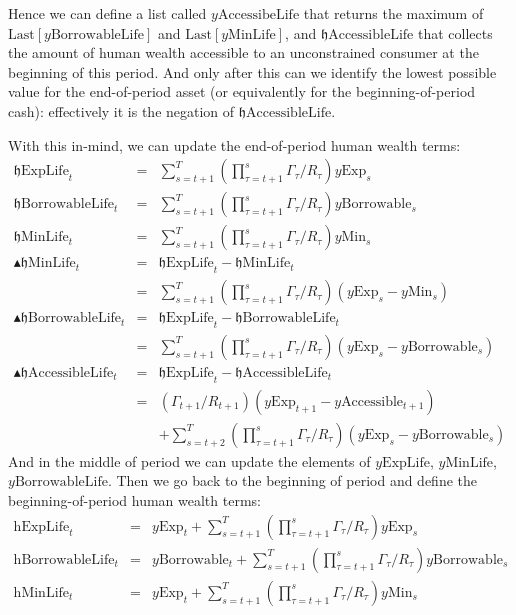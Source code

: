 \documentclass[titlepage,abstract]{\econtex}
\providecommand{\hExpLife}{\mathrm{h}\text{ExpLife}}
\providecommand{\hMinLife}{\mathrm{h}\text{MinLife}}
\providecommand{\hBorrowableLife}{\mathrm{h}\text{BorrowableLife}}
\providecommand{\hEndExpLife}{\mathfrak{h}\text{ExpLife}}
\providecommand{\hEndMinLife}{\mathfrak{h}\text{MinLife}}
\providecommand{\hEndBorrowableLife}{\mathfrak{h}\text{BorrowableLife}}
\providecommand{\hEndAccessibleLife}{\mathfrak{h}\text{AccessibleLife}}
\providecommand{\DeltahEndMinLife}{\blacktriangle \mathfrak{h}\text{MinLife}}
\providecommand{\DeltahEndBorrowableLife}{\blacktriangle \mathfrak{h}\text{BorrowableLife}}
\providecommand{\DeltahEndAccessibleLife}{\blacktriangle \mathfrak{h}\text{AccessibleLife}}
\providecommand{\yMinLife}{y\text{MinLife}}
\providecommand{\yBorrowableLife}{y\text{BorrowableLife}}
\providecommand{\yAccessibleLife}{y\text{AccessibeLife}}
\providecommand{\yExpLife}{y\text{ExpLife}}
\providecommand{\yMin}{y\text{Min}}
\providecommand{\yBorrowable}{y\text{Borrowable}}
\providecommand{\yAccessible}{y\text{Accessible}}
\providecommand{\yExp}{y\text{Exp}}
\begin{document}
Hence we can define a list called $\yAccessibleLife$ that returns the maximum of $\text{Last}[\yBorrowableLife]$ and $\text{Last}[\yMinLife]$, and $\hEndAccessibleLife$ that collects the amount of human wealth accessible to an unconstrained consumer at the beginning of this period. And only after this can we identify the lowest possible value for the end-of-period asset (or equivalently for the beginning-of-period cash): effectively it is the negation of $\hEndAccessibleLife$.

With this in-mind, we can update the end-of-period human wealth terms:
\begin{eqnarray}
          \hEndExpLife_{t} &=& \sum_{s=t+1}^{T} (\prod_{\tau=t+1}^{s}\Gamma_{\tau} /R_{\tau}) \yExp_{s} \\
          \hEndBorrowableLife_{t} &=& \sum_{s=t+1}^{T} (\prod_{\tau=t+1}^{s}\Gamma_{\tau}/R_{\tau}) \yBorrowable_{s} \\
          \hEndMinLife_{t} &=& \sum_{s=t+1}^{T} (\prod_{\tau=t+1}^{s}\Gamma_{\tau}/R_{\tau}) \yMin_{s} \\
          \DeltahEndMinLife_{t} &=& \hEndExpLife_{t} -  \hEndMinLife_{t}\\
                          &=& \sum_{s=t+1}^{T} (\prod_{\tau=t+1}^{s}\Gamma_{\tau}/R_{\tau}) (\yExp_{s}-\yMin_{s}) \\
          \DeltahEndBorrowableLife_{t} &=& \hEndExpLife_{t} -  \hEndBorrowableLife_{t}\\
                          &=& \sum_{s=t+1}^{T} (\prod_{\tau=t+1}^{s}\Gamma_{\tau}/R_{\tau}) (\yExp_{s}-\yBorrowable_{s}) \\
          \DeltahEndAccessibleLife_{t} &=& \hEndExpLife_{t} -  \hEndAccessibleLife_{t}\\
                          &=& (\Gamma_{t+1}/R_{t+1}) (\yExp_{t+1}-\yAccessible_{t+1}) \\
                          & & +\sum_{s=t+2}^{T} (\prod_{\tau=t+1}^{s}\Gamma_{\tau}/R_{\tau}) (\yExp_{s}-\yBorrowable_{s})
\end{eqnarray}
And in the middle of period we can update the elements of $\yExpLife$, $\yMinLife$, $\yBorrowableLife$. Then we go back to the beginning of period and define the beginning-of-period human wealth terms:
\begin{eqnarray}
          \hExpLife_{t} &=& \yExp_{t} + \sum_{s=t+1}^{T} (\prod_{\tau=t+1}^{s}\Gamma_{\tau} /R_{\tau}) \yExp_{s} \\
          \hBorrowableLife_{t} &=& \yBorrowable_{t} + \sum_{s=t+1}^{T} (\prod_{\tau=t+1}^{s}\Gamma_{\tau}/R_{\tau}) \yBorrowable_{s} \\
          \hMinLife_{t} &=& \yExp_{t} +\sum_{s=t+1}^{T} (\prod_{\tau=t+1}^{s}\Gamma_{\tau}/R_{\tau}) \yMin_{s}
\end{eqnarray}
\end{document}
